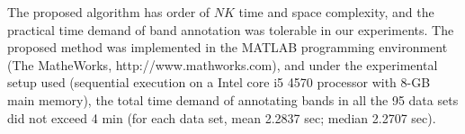 The proposed algorithm has order of $NK$ time and space complexity, and the practical time demand of band annotation was tolerable in our experiments. The proposed method was implemented in the MATLAB programming environment (The MatheWorks, http://www.mathworks.com), and under the experimental setup used (sequential execution on a Intel core i5 4570 processor with 8-GB main memory), the total time demand of annotating bands in all the 95 data sets did not exceed 4 min (for each data set, mean 2.2837 sec; median 2.2707 sec).

\begin{comment}
\subsection{Use of multiple profiles for band annotation}
The proposed method differs from the earlier tools, FAST, ShapeFinder, and QuShape in that it takes account for every profile altogether, whereas previous methods focused on a single profile at a time with a reference profile if needed; the distinctive robustness of our new method is primarily attributed to this capability to make use of the relationships between profiles. The use of multiple profiles, however, is based on the assumption that all profiles are properly aligned in the previous step. The band annotation through the proposed method can be less reliable if an accurate alignment of profiles is not warranted, and even can be inferior to the earlier methods if profiles are seriously misaligned. The case of L-21 illustrated how an imperfectly aligned set of profiles can lead to an unsatisfactory band annotations as well as $\escore$-score's misjudgement on their quality; for L-21 data sets, $\escore$-score was high since the band annotation on primary profile was exact, but MSE was high because the annotation was inaccurate on the other profiles which were not properly alined with the primary profile.  Dealing with such irregularities would be another challenging task and also a great upgrade for our work, which we set aside for now as our future work.


\end{comment}
